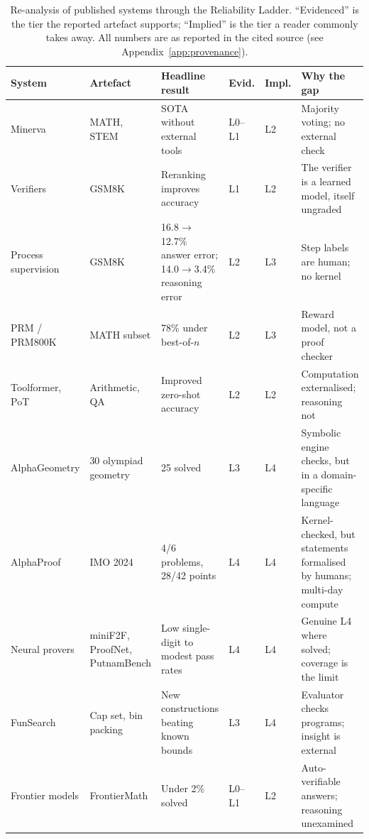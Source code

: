 \documentclass[11pt,a4paper]{article}
\theoremstyle{plain}
\theoremstyle{remark}
\begin{document}
\begin{table}[t]
\caption{Re-analysis of published systems through the Reliability Ladder.
  ``Evidenced'' is the tier the reported artefact supports; ``Implied'' is the
  tier a reader commonly takes away.  All numbers are as reported in the cited
  source (see Appendix~\ref{app:provenance}).}
\label{tab:reanalysis}
\centering\footnotesize
\begin{tabular}{@{}p{1.9cm}p{1.9cm}p{2.5cm}p{0.9cm}p{0.9cm}p{4.4cm}@{}}
\toprule
\textbf{System} & \textbf{Artefact} & \textbf{Headline result} & \textbf{Evid.} & \textbf{Impl.} & \textbf{Why the gap}\\
\midrule
Minerva \cite{lewkowycz2022minerva}
  & MATH, STEM & SOTA without external tools & L0--L1 & L2 & Majority voting; no external check \\
Verifiers \cite{cobbe2021gsm8k}
  & GSM8K & Reranking improves accuracy & L1 & L2 & The verifier is a learned model, itself ungraded \\
Process supervision \cite{uesato2022process}
  & GSM8K & 16.8$\to$12.7\% answer error; 14.0$\to$3.4\% reasoning error & L2 & L3 & Step labels are human; no kernel \\
PRM / PRM800K \cite{lightman2023letsverify}
  & MATH subset & 78\% under best-of-$n$ & L2 & L3 & Reward model, not a proof checker \\
Toolformer, PoT \cite{schick2023toolformer,chen2022pot}
  & Arithmetic, QA & Improved zero-shot accuracy & L2 & L2 & Computation externalised; reasoning not \\
AlphaGeometry \cite{trinh2024alphageometry}
  & 30 olympiad geometry & 25 solved & L3 & L4 & Symbolic engine checks, but in a domain-specific language \\
AlphaProof \cite{hubert2025alphaproof}
  & IMO 2024 & 4/6 problems, 28/42 points & L4 & L4 & Kernel-checked, but statements formalised by humans; multi-day compute \\
Neural provers \cite{han2022minif2f,azerbayev2023proofnet,tsoukalas2024putnambench}
  & miniF2F, ProofNet, PutnamBench & Low single-digit to modest pass rates & L4 & L4 & Genuine L4 where solved; coverage is the limit \\
FunSearch \cite{romera2024funsearch}
  & Cap set, bin packing & New constructions beating known bounds & L3 & L4 & Evaluator checks programs; insight is external \\
Frontier models \cite{glazer2024frontiermath}
  & FrontierMath & Under 2\% solved & L0--L1 & L2 & Auto-verifiable answers; reasoning unexamined \\
\bottomrule
\end{tabular}
\end{table}
\end{document}
